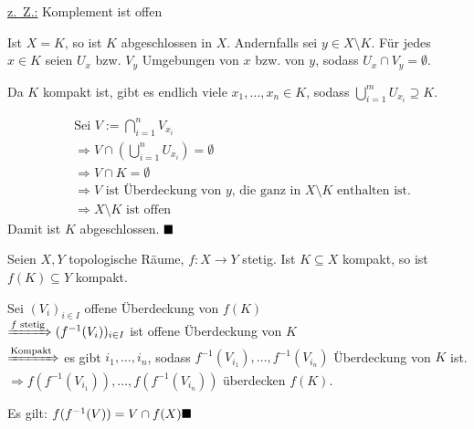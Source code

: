 \begin{beweis}
    \underline{z.~Z.:} Komplement ist offen

    Ist $X = K$, so ist $K$ abgeschlossen in $X$. Andernfalls sei 
    $y \in X \setminus K$. Für jedes $x \in K$ seien $U_x$ bzw. $V_y$
    Umgebungen von $x$ bzw. von $y$, sodass $U_x \cap V_y = \emptyset$.

    \begin{figure}[htp]
        \centering
        
    \end{figure}

    Da $K$ kompakt ist, gibt es endlich viele $x_1, \dots, x_n \in K$,
    sodass $\bigcup_{i=1}^m U_{x_i} \supseteq K$.

    \begin{align*}
        &\text{Sei } V := \bigcap_{i=1}^n V_{x_i}\\
        &\Rightarrow V \cap \left (\bigcup_{i=1}^n U_{x_i} \right) = \emptyset \\
        &\Rightarrow V \cap K = \emptyset\\
        &\Rightarrow V \text{ ist Überdeckung von } y\text{, die ganz in } X \setminus K \text{ enthalten ist}.\\
        &\Rightarrow X \setminus K \text{ ist offen}
    \end{align*}
    Damit ist $K$ abgeschlossen. $\qed$
\end{beweis}

\begin{bemerkung}\label{kor:5.6}%
    Seien $X, Y$ topologische Räume, $f: X \rightarrow Y$ stetig.
    Ist $K \subseteq X$ kompakt, so ist $f(K) \subseteq Y$ kompakt.
\end{bemerkung}

\begin{beweis}
    Sei $(V_i)_{i \in I}$ offene Überdeckung von $f(K)$\\
    $\xRightarrow{f \text{ stetig}} (f^{-1}(V_i))_{i \in I}$ ist offene Überdeckung von $K$\\
    $\xRightarrow{\text{Kompakt}}$ es gibt $i_1, \dots, i_n$, 
    sodass $f^{-1}(V_{i_1}), \dots, f^{-1}(V_{i_n})$ Überdeckung von
    $K$ ist.\\
    $\Rightarrow f(f^{-1}( V_{i_1})), \dots, f(f^{-1}(V_{i_n}))$ 
    überdecken $f(K)$.

    Es gilt: $f(f^{-1}(V)) = V \cap f(X) \qed$
\end{beweis}

